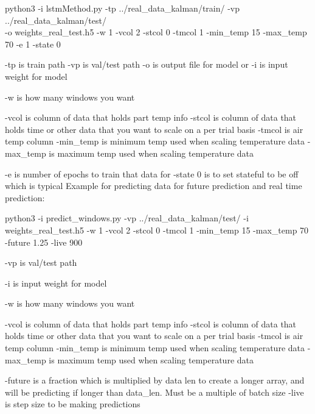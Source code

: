 python3 -i lstmMethod.py -tp ../real\_data\_kalman/train/ -vp ../real\_data\_kalman/test/ \\ -o weights\_real\_test.h5 -w 1 -vcol 2 -stcol 0 -tmcol 1 -min\_temp 15 -max\_temp 70 -e 1 -state 0\\
\rmfamily

-tp is train path
-vp is val/test path
-o is output file for model
or
-i is input weight for model

-w is how many windows you want

-vcol is column of data that holds part temp info
-stcol is column of data that holds time or other data that you want to scale on a per trial basis
-tmcol is air temp column
-min\_temp is minimum temp used when scaling temperature data
-max\_temp is maximum temp used when scaling temperature data

-e is number of epochs to train that data for
-state 0 is to set stateful to be off which is typical
Example for predicting data for future prediction and real time prediction: 
\ttfamily

python3 -i predict\_windows.py -vp ../real\_data\_kalman/test/ -i weights\_real\_test.h5 -w 1 -vcol 2 -stcol 0 -tmcol 1 -min\_temp 15 -max\_temp 70 -future 1.25 -live 900
\rmfamily

-vp is val/test path

-i is input weight for model

-w is how many windows you want

-vcol is column of data that holds part temp info
-stcol is column of data that holds time or other data that you want to scale on a per trial basis
-tmcol is air temp column
-min\_temp is minimum temp used when scaling temperature data
-max\_temp is maximum temp used when scaling temperature data

-future is a fraction which is multiplied by data len to create a longer array, and will be predicting if longer than data\_len. Must be a multiple of batch size 
-live is step size to be making predictions